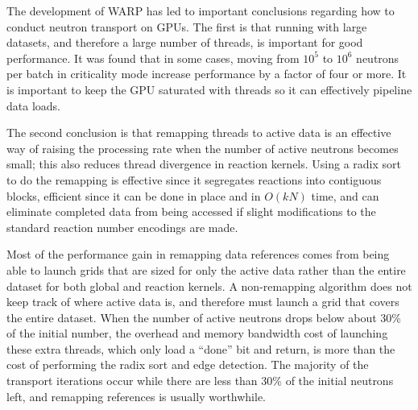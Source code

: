 The development of WARP has led to important conclusions regarding how to conduct neutron transport on GPUs.  The first is that running with large datasets, and therefore a large number of threads, is important for good performance.  It was found that in some cases, moving from $10^5$ to $10^6$ neutrons per batch in criticality mode increase performance by a factor of four or more.  It is important to keep the GPU saturated with threads so it can effectively pipeline data loads.  

The second conclusion is that remapping threads to active data is an effective way of raising the processing rate when the number of active neutrons becomes small; this also reduces thread divergence in reaction kernels.  Using a radix sort to do the remapping is effective since it segregates reactions into contiguous blocks, efficient since it can be done in place and in $O(kN)$ time, and can eliminate completed data from being accessed if slight modifications to the standard reaction number encodings are made.  

Most of the performance gain in remapping data references comes from being able to launch grids that are sized for only the active data rather than the entire dataset for both global and reaction kernels.  A non-remapping algorithm does not keep track of where active data is, and therefore must launch a grid that covers the entire dataset.  When the number of active neutrons drops below about 30\% of the initial number, the overhead and memory bandwidth cost of launching these extra threads, which only load a ``done'' bit and return, is more than the cost of performing the radix sort and edge detection.  The majority of the transport iterations occur  while there are less than 30\% of the initial neutrons left, and remapping references is usually worthwhile.

